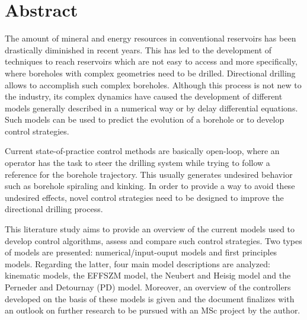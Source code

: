 %


\chapter*{Abstract}%

The amount of mineral and energy resources in conventional reservoirs has been drastically diminished in recent years. This has led to the development of techniques to reach reservoirs which are not easy to access and more specifically, where boreholes with complex geometries need to be drilled. Directional drilling allows to accomplish such complex boreholes. Although this process is not new to the industry, its complex dynamics have caused the development of different models generally described in a numerical way or by delay differential equations. Such models can be used to predict the evolution of a borehole or to develop control strategies. 

Current state-of-practice control methods are basically open-loop, where an operator has the task to steer the drilling system while trying to follow a reference for the borehole trajectory. This usually generates undesired behavior such as borehole spiraling and kinking. In order to provide a way to avoid these undesired effects, novel control strategies need to be designed to improve the directional drilling process. 

This literature study aims to provide an overview of the current models used to develop control algorithms, assess and compare such control strategies. Two types of models are presented: numerical/input-ouput models and first principles models. Regarding the latter, four main model descriptions are analyzed: kinematic models, the \acf{EFFSZM} model, the Neubert and Heisig model and the Perneder and Detournay (PD) model. Moreover, an overview of the controllers developed on the basis of these models is given and the document finalizes with an outlook on further research to be pursued with an MSc project by the author.




